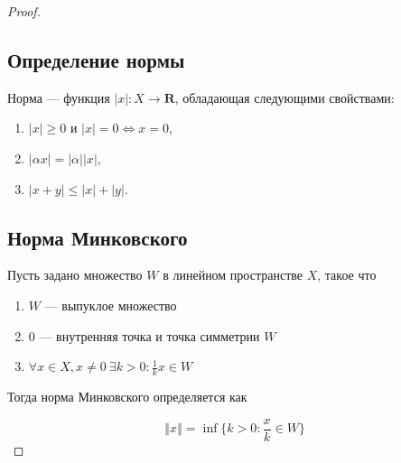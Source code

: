 \begin{proof}\hfill

    \subsection*{Определение нормы}

    Норма — функция $|x|: X \rightarrow \mathbf{R}$, обладающая следующими свойствами:

    \begin{enumerate}
        \item $|x| \geq 0$ и $|x| = 0 \Leftrightarrow x = 0$,
        \item $|\alpha x| = |\alpha| |x|$,
        \item $|x + y| \leq |x| + |y|$.
    \end{enumerate}

    \subsection*{Норма Минковского}

    Пусть задано множество $W$ в линейном пространстве $X$, такое что

    \begin{enumerate}
        \item $W$ — выпуклое множество
        \item $0$ — внутренняя точка и точка симметрии $W$
        \item $\forall x \in X, x \neq 0\ \exists k > 0: \frac{1}{k} x \in W$
    \end{enumerate}

    Тогда норма Минковского определяется как

    \[
        \left\Vert x \right\Vert = \inf \{ k > 0: \frac{x}{k} \in W \}
    \]


\end{proof}
